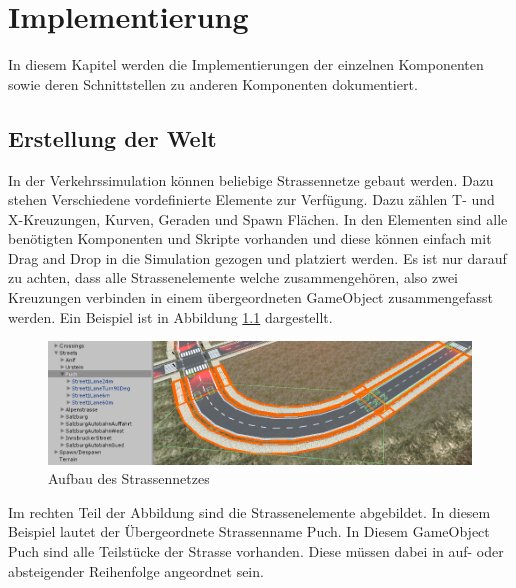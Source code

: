 
\chapter{Implementierung}
\label{Implementierung}

In diesem Kapitel werden die Implementierungen der einzelnen Komponenten sowie deren Schnittstellen zu anderen Komponenten dokumentiert.

\thispagestyle{standard}
\pagestyle{standard}

\section{Erstellung der Welt}
\label{Erstellung_der_Welt}


In der Verkehrssimulation können beliebige Strassennetze gebaut werden. Dazu stehen Verschiedene vordefinierte Elemente zur Verfügung. Dazu zählen T- und X-Kreuzungen, Kurven, Geraden und Spawn Flächen. In den Elementen sind alle benötigten Komponenten und Skripte vorhanden und diese können einfach mit Drag and Drop in die Simulation gezogen und platziert werden. Es ist nur darauf zu achten, dass
alle Strassenelemente welche zusammengehören, also zwei Kreuzungen verbinden in einem übergeordneten GameObject zusammengefasst werden. Ein Beispiel ist in Abbildung \ref{img:streetbbuild} dargestellt.

\begin{figure}[H]
\begin{center}
	\includegraphics[width=1\textwidth]{BilderAllgemein/streetImpl.PNG}
\end{center}
	\caption{Aufbau des Strassennetzes}
	\label{img:streetbbuild}
\end{figure}

Im rechten Teil der Abbildung sind die Strassenelemente abgebildet. In diesem Beispiel lautet der Übergeordnete Strassenname \grqq Puch\grqq. In Diesem GameObject \grqq Puch\grqq{} sind alle Teilstücke der Strasse vorhanden. Diese müssen dabei in auf- oder absteigender Reihenfolge angeordnet sein.

